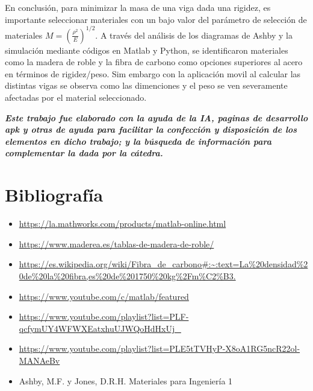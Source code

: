 \documentclass[15pt,a4paper]{article}
\begin{document}
En conclusión, para minimizar la masa de una viga dada una rigidez, es importante seleccionar materiales con un bajo valor del parámetro de selección de materiales \( M=(\frac{\rho{^2}}{E})^{1/2} \). A través del análisis de los diagramas de Ashby y la simulación mediante códigos en Matlab y Python, se identificaron materiales como la madera de roble y la fibra de carbono como opciones superiores al acero en términos de rigidez/peso. Sim embargo con la aplicación movil al calcular las distintas vigas se observa como las dimenciones y el peso se ven severamente afectadas por el material seleccionado.

\vfill
\textit{\textbf{Este trabajo fue elaborado con la ayuda de la IA, paginas de desarrollo apk y otras de ayuda para facilitar la confección y disposición de los elementos en dicho trabajo; y la búsqueda de información para complementar la dada por la cátedra.}}

\newpage
\section{Bibliografía}
\begin{itemize}
    \item \url{https://la.mathworks.com/products/matlab-online.html}
    \item \url{https://www.maderea.es/tablas-de-madera-de-roble/}
    \item \url{https://es.wikipedia.org/wiki/Fibra_de_carbono#:~:text=La%20densidad%20de%20la%20fibra,es%20de%201750%20kg%2Fm%C2%B3.}
    \item \url{https://www.youtube.com/c/matlab/featured}
    \item \url{https://www.youtube.com/playlist?list=PLF-qcfymUY4WFWXEatxhuUJWQoHdHxUj_ }
    \item \url{https://www.youtube.com/playlist?list=PLE5tTVHyP-X8oA1RG5ncR22ol-MANAeBv}
    \item Ashby, M.F. y Jones, D.R.H. Materiales para Ingeniería 1
\end{itemize}
\end{document}
